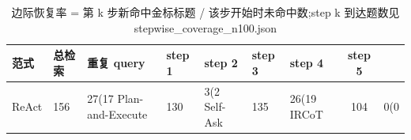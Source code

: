 \begin{table}[htbp]
\centering
\caption{边际恢复率 = 第 k 步新命中金标标题 / 该步开始时未命中数;step k 到达题数见 stepwise_coverage_n100.json}
\begin{tabular}{lllllllc}
\toprule
范式 & 总检索 & 重复 query & step 1 & step 2 & step 3 & step 4 & step 5 \\
\midrule
ReAct & 156 & 27(17%
Plan-and-Execute & 130 & 3(2%
Self-Ask & 135 & 26(19%
IRCoT & 104 & 0(0%
\bottomrule
\end{tabular}
\end{table}
